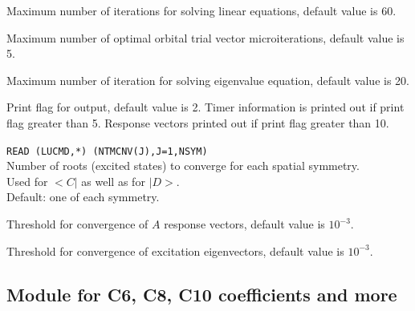 \begin{description}
\item{}
Maximum number of iterations for solving linear equations, default value is 60.

\item{}
Maximum number of optimal orbital trial vector microiterations,
default value is 5.

\item{}
Maximum number of iteration for solving eigenvalue equation, default
value is 20.

\item{}
Print flag for output, default value is 2. Timer information is printed
out if print flag greater than 5. Response vectors printed out if
print flag greater than 10.

\item{}
\verb|READ (LUCMD,*) (NTMCNV(J),J=1,NSYM)|\\
Number of roots (excited states) to converge for each spatial symmetry.\\
Used for $<C|$ as well as for $|D>$.\\
Default: one of each symmetry.

\item{}
Threshold for convergence of $A$ response vectors, default value is $10^{-3}$.

\item{}
Threshold for convergence of excitation eigenvectors, default value is $10^{-3}$.

\end{description}

\subsection{Module for C6, C8, C10 coefficients and more}


